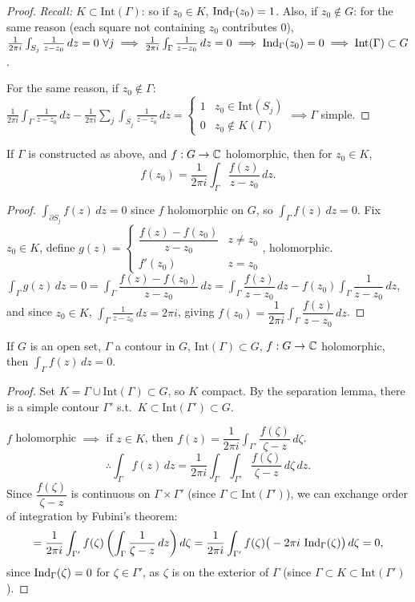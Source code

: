 \documentclass[11pt]{article}
\begin{document}
\begin{proof}
\emph{Recall:} $K\subset\mathrm{Int}(\Gamma)$: so if $z_0\in K$, $\operatorname{Ind}_\Gamma(z_0)=1$. Also, if $z_0\notin G$: for the same reason (each square not containing $z_0$ contributes $0$), $\frac{1}{2\pi i}\int_{S_j}\frac{1}{z-z_0}\,dz=0\ \forall j \implies \frac{1}{2\pi i}\int_\Gamma\frac{1}{z-z_0}\,dz=0 \implies \operatorname{Ind}_\Gamma(z_0)=0 \implies \mathrm{Int}(\Gamma)\subset G$.

For the same reason, if $z_0\notin\Gamma$: $\frac{1}{2\pi i}\int_\Gamma \frac{1}{z-z_0}\,dz - \frac{1}{2\pi i}\sum_j \int_{S_j}\frac{1}{z-z_0}\,dz = \begin{cases}1 & z_0\in\mathrm{Int}(S_j)\\0 & z_0\notin K(\Gamma)\end{cases} \implies \Gamma$ simple.
\end{proof}

\begin{corollary}
If $\Gamma$ is constructed as above, and $f:G\to{\mathbb{C}}$ holomorphic, then for $z_0\in K$,
\[
f(z_0) = \frac{1}{2\pi i}\int_\Gamma \frac{f(z)}{z-z_0}\,dz.
\]
\end{corollary}
\begin{proof}
$\int_{\partial S_j} f(z)\,dz=0$ since $f$ holomorphic on $G$, so $\int_\Gamma f(z)\,dz=0$.
Fix $z_0\in K$, define $g(z) = \begin{cases} \dfrac{f(z)-f(z_0)}{z-z_0} & z\ne z_0\\ f'(z_0) & z=z_0\end{cases}$, holomorphic. $\int_\Gamma g(z)\,dz=0 = \int_\Gamma \dfrac{f(z)-f(z_0)}{z-z_0}\,dz = \int_\Gamma \dfrac{f(z)}{z-z_0}\,dz - f(z_0)\int_\Gamma \dfrac{1}{z-z_0}\,dz$, and since $z_0\in K$, $\int_\Gamma \frac{1}{z-z_0}\,dz = 2\pi i$, giving $f(z_0) = \dfrac{1}{2\pi i}\int_\Gamma \dfrac{f(z)}{z-z_0}\,dz$.
\end{proof}

\begin{theorem}
If $G$ is an open set, $\Gamma$ a contour in $G$, $\mathrm{Int}(\Gamma)\subset G$, $f:G\to{\mathbb{C}}$ holomorphic, then $\int_\Gamma f(z)\,dz=0$.
\end{theorem}
\begin{proof}
Set $K = \Gamma\cup\mathrm{Int}(\Gamma) \subset G$, so $K$ compact. By the separation lemma, there is a simple contour $\Gamma'$ s.t.\ $K\subset\mathrm{Int}(\Gamma')\subset G$.

$f$ holomorphic $\implies$ if $z\in K$, then $f(z) = \dfrac{1}{2\pi i}\int_{\Gamma'} \dfrac{f(\zeta)}{\zeta-z}\,d\zeta$.
\[
\therefore \int_\Gamma f(z)\,dz = \frac{1}{2\pi i}\int_\Gamma\int_{\Gamma'} \frac{f(\zeta)}{\zeta-z}\,d\zeta\,dz.
\]
Since $\dfrac{f(\zeta)}{\zeta-z}$ is continuous on $\Gamma\times\Gamma'$ (since $\Gamma\subset\mathrm{Int}(\Gamma')$), we can exchange order of integration by Fubini's theorem:
\[
= \frac{1}{2\pi i}\int_{\Gamma'} f(\zeta)\left(\int_\Gamma \frac{1}{\zeta-z}\,dz\right)d\zeta = \frac{1}{2\pi i}\int_{\Gamma'} f(\zeta)\big(-2\pi i\,\operatorname{Ind}_\Gamma(\zeta)\big)\,d\zeta = 0,
\]
since $\operatorname{Ind}_\Gamma(\zeta)=0$ for $\zeta\in\Gamma'$, as $\zeta$ is on the exterior of $\Gamma$ (since $\Gamma\subset K \subset\mathrm{Int}(\Gamma')$).
\end{proof}
\end{document}
